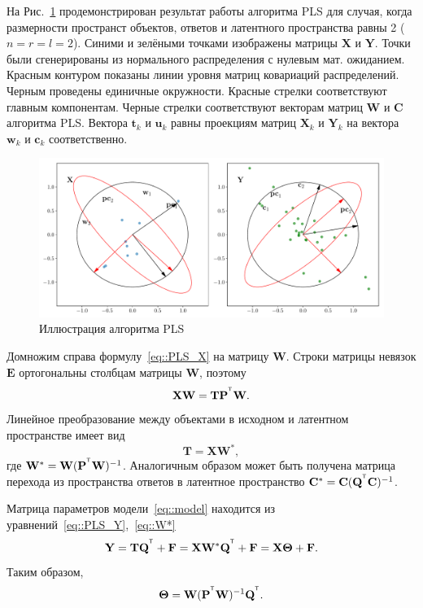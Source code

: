 \documentclass[12pt,twoside]{article}
\newcommand{\bw}{\mathbf{w}}
\newcommand{\bY}{\mathbf{Y}}
\newcommand{\bX}{\mathbf{X}}
\newcommand{\bu}{\mathbf{u}}
\newcommand{\bt}{\mathbf{t}}
\newcommand{\bc}{\mathbf{c}}
\newcommand{\bP}{\mathbf{P}}
\newcommand{\bT}{\mathbf{T}}
\newcommand{\bQ}{\mathbf{Q}}
\newcommand{\bC}{\mathbf{C}}
\newcommand{\bE}{\mathbf{E}}
\newcommand{\bF}{\mathbf{F}}
\newcommand{\bW}{\mathbf{W}}
\newcommand{\bTheta}{\boldsymbol{\Theta}}
\begin{document}
На Рис.~\ref{fig::PLSFigure} продемонстрирован результат работы алгоритма PLS для случая, когда размерности пространст объектов, ответов и латентного пространства равны 2 ($n = r = l = 2$).
Синими и зелёными точками изображены матрицы $\bX$ и $\bY$. 
Точки были сгенерированы из нормального распределения с нулевым мат. ожиданием. 
Красным контуром показаны линии уровня матриц ковариаций распределений. 
Черным проведены единичные окружности. 
Красные стрелки соответствуют главным компонентам. 
Черные стрелки соответствуют векторам матриц $\bW$ и $\bC$ алгоритма PLS. 
Вектора $\bt_k$ и $\bu_k$ равны проекциям матриц $\bX_k$ и $\bY_k$ на вектора $\bw_k$ и $\bc_k$ соответственно. 
\begin{figure}[h]
	\centering
	\includegraphics[width=\linewidth]{figs/PLSFigure.pdf}
	\caption{Иллюстрация алгоритма PLS}
	\label{fig::PLSFigure}
\end{figure}

Домножим справа формулу~\eqref{eq::PLS_X} на матрицу $\bW$. Строки матрицы невязок $\bE$ ортогональны столбцам матрицы $\bW$, поэтому 
\[
	\bX \bW = \bT \bP^{\T} \bW.
\] 
Линейное преобразование между объектами в исходном и латентном пространстве имеет вид
\begin{equation}
	\bT = \bX \bW^*,
	\label{eq::W*}
\end{equation}
где $\bW^* = \bW (\bP^{\T} \bW)^{-1}$. Аналогичным образом может быть получена матрица перехода из пространства ответов в латентное пространство $\bC^* = \bC (\bQ^{\T} \bC)^{-1}$.

Матрица параметров модели~\ref{eq::model} находится из уравнений~\eqref{eq::PLS_Y},~\eqref{eq::W*}
\begin{equation*}
    \bY = \bT \bQ^{\T} + \bF = \bX \bW^* \bQ^{\T} + \bF = \bX \bTheta + \bF.
\end{equation*}
Таким образом, 
\begin{equation*}
    \bTheta = \bW (\bP^{\T} \bW)^{-1} \bQ^{\T}.
\end{equation*}
\end{document}
